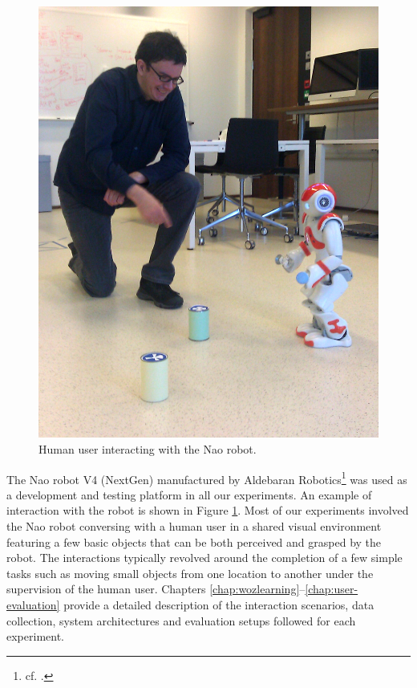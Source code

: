 \begin{figure}
\vspace{-2mm}
\centering 
\includegraphics[scale=0.1]{imgs/nao1.jpg}
\caption{Human user interacting with the Nao robot.}
\label{fig:nao}
\end{figure}

The Nao robot V4 (NextGen)  manufactured by Aldebaran Robotics\footnote{cf.  .} was used as a development and testing platform in all our experiments. An example of interaction with the robot is shown in Figure \ref{fig:nao}.  Most of our experiments involved the Nao robot conversing with a human user in a shared visual environment featuring a few basic objects that can be both perceived and grasped by the robot.  The interactions typically revolved around the completion of a few simple tasks such as moving small objects from one location to another under the supervision of the human user. Chapters \ref{chap:wozlearning}--\ref{chap:user-evaluation} provide a detailed description of the interaction scenarios, data collection, system architectures and evaluation setups followed for each experiment. 

